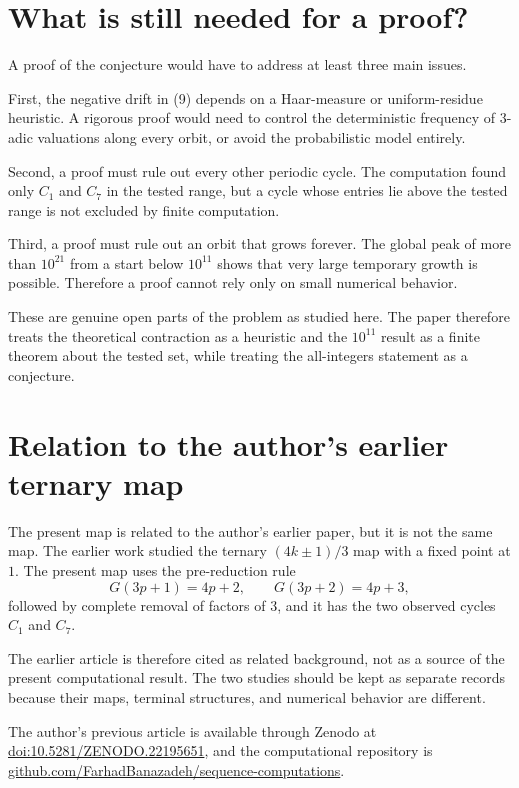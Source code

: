 \documentclass[11pt]{article}
\begin{document}
\section{What is still needed for a proof?}
A proof of the conjecture would have to address at least three main issues.

First, the negative drift in (9) depends on a Haar-measure or uniform-residue heuristic. A rigorous proof would need to control the deterministic frequency of $3$-adic valuations along every orbit, or avoid the probabilistic model entirely.

Second, a proof must rule out every other periodic cycle. The computation found only $C_1$ and $C_7$ in the tested range, but a cycle whose entries lie above the tested range is not excluded by finite computation.

Third, a proof must rule out an orbit that grows forever. The global peak of more than $10^{21}$ from a start below $10^{11}$ shows that very large temporary growth is possible. Therefore a proof cannot rely only on small numerical behavior.

These are genuine open parts of the problem as studied here. The paper therefore treats the theoretical contraction as a heuristic and the $10^{11}$ result as a finite theorem about the tested set, while treating the all-integers statement as a conjecture.

\section{Relation to the author's earlier ternary map}
The present map is related to the author's earlier paper, but it is not the same map. The earlier work studied the ternary $(4k\pm1)/3$ map with a fixed point at $1$. The present map uses the pre-reduction rule
\[
G(3p+1)=4p+2,
\qquad
G(3p+2)=4p+3,
\]
followed by complete removal of factors of $3$, and it has the two observed cycles $C_1$ and $C_7$.

The earlier article is therefore cited as related background, not as a source of the present computational result. The two studies should be kept as separate records because their maps, terminal structures, and numerical behavior are different.

The author's previous article is available through Zenodo at
\href{https://doi.org/10.5281/ZENODO.22195651}{doi:10.5281/ZENODO.22195651},
and the computational repository is
\href{https://github.com/FarhadBanazadeh/sequence-computations}{github.com/FarhadBanazadeh/sequence-computations}.
\end{document}
